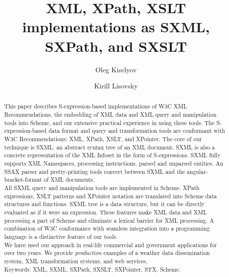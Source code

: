 \documentclass[10pt]{llncs}
\begin{document}
\title{XML, XPath, XSLT implementations as SXML,
SXPath, and SXSLT}
\author{Oleg Kiselyov \and Kirill Lisovsky}
\maketitle
\begin{abstract}
This paper describes S-expression-based implementations of W3C
XML Recommendations, the embedding of XML data and XML query and
manipulation tools into Scheme, and our extensive practical experience
in using these tools. The S-expression-based data format and query and
transformation tools are conformant with W3C Recommendations: XML,
XPath, XSLT, and XPointer. The core of our technique is SXML: an
abstract syntax tree of an XML document. SXML is also a concrete
representation of the XML Infoset in the form of S-expressions. SXML
fully supports XML Namespaces, processing instructions, parsed and
unparsed entities.  An SSAX parser and pretty-printing tools
convert between SXML and the angular-bracket-format of XML documents.\\ All SXML query and manipulation tools are implemented in
Scheme. XPath expressions, XSLT patterns and XPointer notation are
translated into Scheme data structures and functions. SXML tree is a
data structure, but it can be directly evaluated as if it were an
expression. These features make XML data and XML processing a part of
Scheme and eliminate a lexical barrier for XML processing. A
combination of W3C conformance with seamless integration into a
programming language is a distinctive feature of our tools.\\ We have used our approach in real-life commercial and government
applications for over two years.  We provide \emph{production}
examples of a weather data dissemination system, XML transformation
systems, and web services.\\Keywords: XML, SXML, SXPath, SXSLT, SXPointer, STX, Scheme.\end{abstract}
\end{document}
